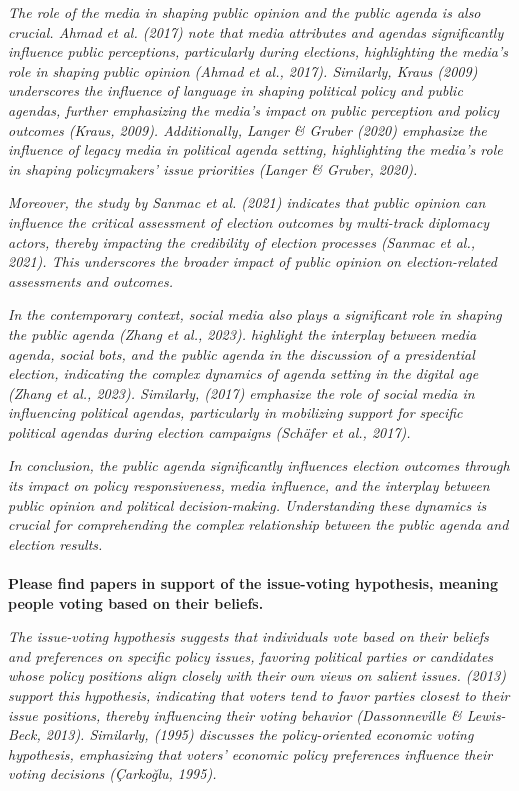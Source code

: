 \documentclass[11pt,a4paper]{article}
\begin{document}
 \textit{The role of the media in shaping public opinion and the public agenda is also crucial. Ahmad et al. (2017) note that media attributes and agendas significantly influence public perceptions, particularly during elections, highlighting the media's role in shaping public opinion (Ahmad et al., 2017). Similarly, Kraus (2009) underscores the influence of language in shaping political policy and public agendas, further emphasizing the media's impact on public perception and policy outcomes (Kraus, 2009). Additionally, Langer \& Gruber (2020) emphasize the influence of legacy media in political agenda setting, highlighting the media's role in shaping policymakers' issue priorities (Langer \& Gruber, 2020).}

 \textit{Moreover, the study by Sanmac et al. (2021) indicates that public opinion can influence the critical assessment of election outcomes by multi-track diplomacy actors, thereby impacting the credibility of election processes (Sanmac et al., 2021). This underscores the broader impact of public opinion on election-related assessments and outcomes.}

 \textit{In the contemporary context, social media also plays a significant role in shaping the public agenda (Zhang et al., 2023). highlight the interplay between media agenda, social bots, and the public agenda in the discussion of a presidential election, indicating the complex dynamics of agenda setting in the digital age (Zhang et al., 2023). Similarly, (2017) emphasize the role of social media in influencing political agendas, particularly in mobilizing support for specific political agendas during election campaigns (Schäfer et al., 2017).}

 \textit{In conclusion, the public agenda significantly influences election outcomes through its impact on policy responsiveness, media influence, and the interplay between public opinion and political decision-making. Understanding these dynamics is crucial for comprehending the complex relationship between the public agenda and election results.}
\\
\\
 \textbf{Please find papers in support of the issue-voting hypothesis, meaning people voting based on their beliefs.}

\textit{The issue-voting hypothesis suggests that individuals vote based on their beliefs and preferences on specific policy issues, favoring political parties or candidates whose policy positions align closely with their own views on salient issues. (2013) support this hypothesis, indicating that voters tend to favor parties closest to their issue positions, thereby influencing their voting behavior (Dassonneville \& Lewis-Beck, 2013). Similarly, (1995) discusses the policy-oriented economic voting hypothesis, emphasizing that voters' economic policy preferences influence their voting decisions (Çarkoğlu, 1995).}
\end{document}

